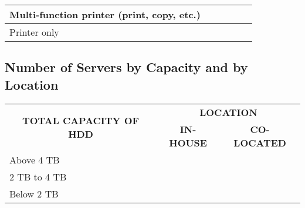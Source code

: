 \documentclass[a4paper,10pt, total={10.95in, 8in}]{article} %
\begin{document}
\begin{table}[H]
\begin{adjustbox}{width=\textwidth}
\begin{tabular}{|l|ccc|c|c|}
Multi-function printer (print, copy, etc.)            & \multicolumn{1}{c|}{}                   & \multicolumn{1}{c|}{}                  &                             &                                                                                                                      &                                                                                  \\ \hline
Printer only                                          & \multicolumn{1}{l|}{}                   & \multicolumn{1}{l|}{}                  & \multicolumn{1}{l|}{}       & \multicolumn{1}{l|}{}                                                                                                & \multicolumn{1}{l|}{}                                                            \\ \hline
\end{tabular}
\end{adjustbox}
\end{table}

\subsection{Number of Servers by Capacity and by Location}
\begin{table}[H]
\renewcommand{\arraystretch}{1.5}
\centering
\begin{adjustbox}{width=4in}
\begin{tabular}{|l|cc|}
\hline
\multicolumn{1}{|c|}{\multirow{2}{*}{\textbf{TOTAL CAPACITY OF HDD}}} & \multicolumn{2}{c|}{\textbf{LOCATION}}                       \\ \cline{2-3} 
\multicolumn{1}{|c|}{}                                                & \multicolumn{1}{c|}{\textbf{IN-HOUSE}} & \textbf{CO-LOCATED} \\ \hline
Above 4 TB                                                            & \multicolumn{1}{c|}{\textbf{}}         & \textbf{}           \\ \hline
2 TB to 4 TB                                                          & \multicolumn{1}{c|}{}                  &                     \\ \hline
Below 2 TB                                                            & \multicolumn{1}{c|}{}                  &                     \\ \hline
\end{tabular}
\end{adjustbox}
\end{table}
\end{document}

